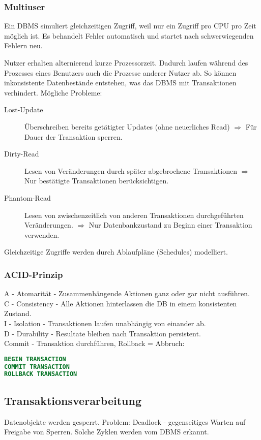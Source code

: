 \subsubsection{Multiuser}
Ein DBMS simuliert gleichzeitigen Zugriff, weil nur ein Zugriff pro CPU pro Zeit möglich ist. Es behandelt Fehler
automatisch und startet nach schwerwiegenden Fehlern neu.

Nutzer erhalten alternierend kurze Prozessorzeit. Dadurch laufen während des Prozesses eines Benutzers auch die 
Prozesse anderer Nutzer ab. So können inkonsistente Datenbestände entstehen, was das DBMS mit Transaktionen verhindert.
Mögliche Probleme:
\begin{description}
	\item [Lost-Update] Überschreiben bereits getätigter Updates (ohne neuerliches Read) $\Rightarrow$ Für Dauer
	der Transaktion sperren.
	\item [Dirty-Read] Lesen von Veränderungen durch später abgebrochene Transaktionen $\Rightarrow$ Nur bestätigte
	Transaktionen berücksichtigen.
	\item [Phantom-Read] Lesen von zwischenzeitlich von anderen Transaktionen durchgeführten Veränderungen. $\Rightarrow$
	Nur Datenbankzustand zu Beginn einer Transaktion verwenden.
\end{description}
Gleichzeitige Zugriffe werden durch Ablaufpläne (Schedules) modelliert.

\subsubsection{ACID-Prinzip}
A - Atomarität - Zusammenhängende Aktionen ganz oder gar nicht ausführen.\\
C - Consistency - Alle Aktionen hinterlassen die DB in einem konsistenten Zustand.\\
I - Isolation - Transaktionen laufen unabhängig von einander ab.\\
D - Durability - Resultate bleiben nach Transaktion persistent.\\

Commit - Transaktion durchführen, Rollback = Abbruch:
\begin{lstlisting}[language=SQL]
BEGIN TRANSACTION
COMMIT TRANSACTION
ROLLBACK TRANSACTION
\end{lstlisting}

\subsection{Transaktionsverarbeitung}
Datenobjekte werden gesperrt. Problem: Deadlock - gegenseitiges Warten auf Freigabe von Sperren. Solche Zyklen werden
vom DBMS erkannt. 

